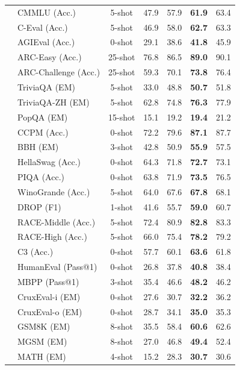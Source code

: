 \begin{table}[!h]
\begin{tabular}{@{}c l c | c | c c !{\color{refgray}\vrule} >{\color{refgray}}c@{}}
    & CMMLU {\tiny (Acc.)} & 5-shot & 47.9 & 57.9 & \textbf{61.9} &  63.4 \\
    & C-Eval {\tiny (Acc.)} & 5-shot & 46.9 & 58.0 & \textbf{62.7} & 63.3 \\
    & AGIEval {\tiny (Acc.)} & 0-shot & 29.1 & 38.6 & \textbf{41.8} & 45.9 \\
    & ARC-Easy {\tiny (Acc.)} & 25-shot & 76.8 & 86.5 & \textbf{89.0} & 90.1 \\
    & ARC-Challenge {\tiny (Acc.)} & 25-shot & 59.3 & 70.1 & \textbf{73.8} &  76.4 \\
    & TriviaQA {\tiny (EM)} & 5-shot & 33.0 & 48.8 & \textbf{50.7} & 51.8 \\
    & TriviaQA-ZH {\tiny (EM)} & 5-shot & 62.8 & 74.8 & \textbf{76.3} & 77.9 \\
    & PopQA {\tiny (EM)} & 15-shot & 15.1 & 19.2 & \textbf{19.4} & 21.2 \\
    & CCPM {\tiny (Acc.)} & 0-shot & 72.2 & 79.6 & \textbf{87.1} &  87.7 \\
    & BBH {\tiny (EM)} & 3-shot & 42.8 & 50.9 & \textbf{55.9} &  57.5 \\
    & HellaSwag {\tiny (Acc.)} & 0-shot & 64.3 & 71.8 & \textbf{72.7} & 73.1 \\
    & PIQA {\tiny (Acc.)} & 0-shot & 63.8 & 71.9 & \textbf{73.5} &  76.5 \\
    & WinoGrande {\tiny (Acc.)} & 5-shot & 64.0 & 67.6 & \textbf{67.8} &  68.1 \\
    \midrule
    & DROP {\tiny (F1)} & 1-shot & 41.6 & 55.7 & \textbf{59.0} & 60.7 \\
    & RACE-Middle {\tiny (Acc.)} & 5-shot & 72.4 & 80.9 & \textbf{82.8} & 83.3 \\
    & RACE-High {\tiny (Acc.)} & 5-shot & 66.0 & 75.4 & \textbf{78.2} & 79.2 \\
    & C3 {\tiny (Acc.)} & 0-shot & 57.7 & 60.1 & \textbf{63.6} &  61.8 \\
    \midrule
    & HumanEval {\tiny (Pass@1)} & 0-shot & 26.8 & 37.8 & \textbf{40.8} & 38.4  \\
    & MBPP {\tiny (Pass@1)} & 3-shot & 35.4 & 46.6 & \textbf{48.2} & 46.2 \\
    & CruxEval-i {\tiny (EM)} & 0-shot &27.6&30.7 & \textbf{32.2} & 36.2 \\
    & CruxEval-o {\tiny (EM)} & 0-shot &28.7&34.1 & \textbf{35.0} & 35.3 \\
    & GSM8K {\tiny (EM)} & 8-shot & 35.5 & 58.4 & \textbf{60.6} & 62.6 \\
    & MGSM {\tiny (EM)} & 8-shot & 27.0 & 46.8 & \textbf{49.4} &  52.4 \\
    & MATH {\tiny (EM)} & 4-shot & 15.2 & 28.3 & \textbf{30.7} & 30.6 \\
    \bottomrule
    \end{tabular}

    \label{tab:27b_eval}
\end{table}


